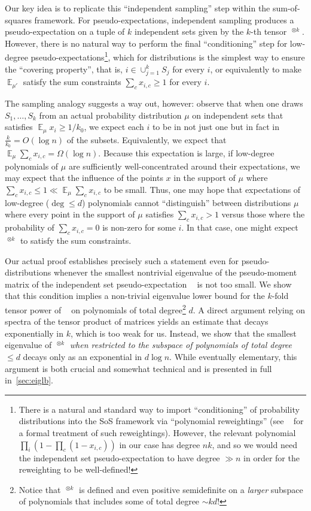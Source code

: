 \documentclass[10pt,a4paper]{article}
\theoremstyle{definition}
\newcommand{\Esymb}{\mathbb{E}}
\DeclareMathOperator*{\E}{\Esymb}
\DeclareMathOperator{\pE}{\tilde{\mathbb{E}}}
\newcommand{\numcolors}{k}
\newcommand{\numlb}{k_0}
\begin{document}
Our key idea is to replicate this ``independent sampling'' step within the sum-of-squares framework. For pseudo-expectations, independent sampling produces a pseudo-expectation on a tuple of $\numcolors$ independent sets given by the $\numcolors$-th tensor $\pE^{\otimes \numcolors}$. However, there is no natural way to perform the final ``conditioning'' step for low-degree pseudo-expectations\footnote{There is a natural and standard way to import ``conditioning'' of probability distributions into the SoS framework via ``polynomial reweightings'' (see ~\cite{DBLP:conf/stoc/BarakKS17} for a formal treatment of such reweightings). However, the relevant polynomial $\prod_{i} (1 - \prod_{c} (1 - x_{i,c}))$ in our case has degree $n \numcolors$, and so we would need the independent set pseudo-expectation to have degree $\gg n$ in order for the reweighting to be well-defined!}, which for distributions is the simplest way to ensure the ``covering property'', that is,  $i \in \cup_{j = 1}^{\numcolors} S_j$ for every $i$, or equivalently to make $\E_{\mu'}$ satisfy the sum constraints $\sum_c x_{i,c} \geq 1$ for every $i$. 

The sampling analogy suggests a way out, however: observe that when one draws $S_1, \dots, S_{\numcolors}$ from an actual probability distribution $\mu$ on independent sets that satisfies $\E_{\mu} x_i \geq 1/\numlb$, we expect each $i$ to be in not just one but in fact in $\frac{k}{\numlb} = O(\log n)$ of the subsets. Equivalently, we expect that $\E_{\mu} \sum_c x_{i,c} = \Omega(\log n)$. Because this expectation is large, if low-degree polynomials of $\mu$ are sufficiently well-concentrated around their expectations, we may expect that the influence of the points $x$ in the support of $\mu$ where $\sum_{c} x_{i,c} \leq 1 \ll \E_{\mu} \sum_{c} x_{i,c}$ to be small. Thus, one may hope that expectations of low-degree ($\deg \leq d$) polynomials cannot ``distinguish'' between distributions $\mu$ where every point in the support of $\mu$ satisfies $\sum_c x_{i,c} > 1$ versus those where the probability of $\sum_c x_{i,c} = 0$ is non-zero for some $i$. In that case, one might expect $\pE^{\otimes k}$ to satisfy the sum constraints. 

Our actual proof establishes precisely such a statement even for pseudo-distributions whenever the smallest nontrivial eigenvalue of the pseudo-moment matrix of the independent set pseudo-expectation $\pE$ is not too small. We show that this condition implies a non-trivial eigenvalue lower bound for the $k$-fold tensor power of $\pE$ on polynomials of total degree\footnote{Notice that $\pE^{\otimes \numcolors}$ is defined and even positive semidefinite on a \emph{larger} subspace of polynomials that includes some of total degree $\sim kd$!} $d$. A direct argument relying on spectra of the tensor product of matrices yields an estimate that decays exponentially in $k$, which is too weak for us. Instead, we show that the smallest eigenvalue of $\pE^{\otimes k}$ \emph{when restricted to the subspace of polynomials of total degree $\leq d$} decays only as an exponential in $d \log n$. While eventually elementary, this argument is both crucial and somewhat technical and is presented in full in~\cref{sec:eiglb}. 
\end{document}
